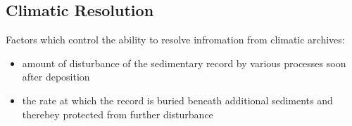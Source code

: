 \subsection{Climatic Resolution}

Factors which control the ability to resolve infromation from climatic
archives:
\begin{itemize}
	\item amount of disturbance of the sedimentary record by various
	processes soon after deposition
	\item the rate at which the record is buried beneath additional
	sediments and therebey protected from further disturbance
\end{itemize}
